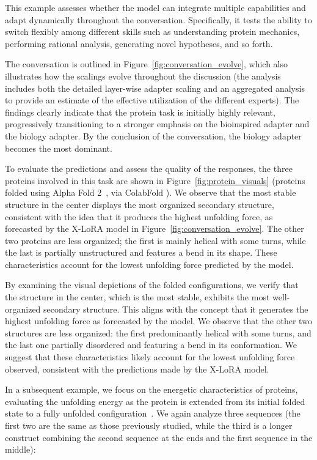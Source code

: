 This example assesses whether the model can integrate multiple capabilities and adapt dynamically throughout the conversation. Specifically, it tests the ability to switch flexibly among different skills such as understanding protein mechanics, performing rational analysis, generating novel hypotheses, and so forth.

The conversation is outlined in Figure~\ref{fig:conversation_evolve}, which also illustrates how the scalings evolve throughout the discussion (the analysis includes both the detailed layer-wise adapter scaling and an aggregated analysis to provide an estimate of the effective utilization of the different experts). The findings clearly indicate that the protein task is initially highly relevant, progressively transitioning to a stronger emphasis on the bioinspired adapter and the biology adapter. By the conclusion of the conversation, the biology adapter becomes the most dominant. 

To evaluate the predictions and assess the quality of the responses, the three proteins involved in this task are shown in Figure~\ref{fig:protein_visuals} (proteins folded using Alpha Fold 2~\cite{Jumper2021HighlyAlphaFoldb}, via ColabFold \cite{Mirdita2022ColabFold:All}). We observe that the most stable structure in the center displays the most organized secondary structure, consistent with the idea that it produces the highest unfolding force, as forecasted by the X-LoRA model in Figure~\ref{fig:conversation_evolve}. The other two proteins are less organized; the first is mainly helical with some turns, while the last is partially unstructured and features a bend in its shape. These characteristics account for the lowest unfolding force predicted by the model.

By examining the visual depictions of the folded configurations, we verify that the structure in the center, which is the most stable, exhibits the most well-organized secondary structure. This aligns with the concept that it generates the highest unfolding force as forecasted by the model. We observe that the other two structures are less organized: the first predominantly helical with some turns, and the last one partially disordered and featuring a bend in its conformation. We suggest that these characteristics likely account for the lowest unfolding force observed, consistent with the predictions made by the X-LoRA model.

In a subsequent example, we focus on the energetic characteristics of proteins, evaluating the unfolding energy as the protein is extended from its initial folded state to a fully unfolded configuration~\cite{Ni2023ForceGen:Model}. We again analyze three sequences (the first two are the same as those previously studied, while the third is a longer construct combining the second sequence at the ends and the first sequence in the middle):

